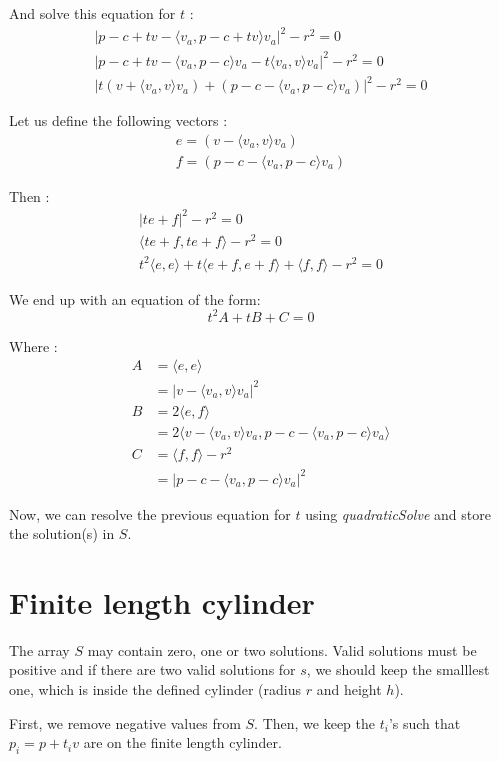 \documentclass{article}
\begin{document}
And solve this equation for $t$ :
\begin{gather*}
    |p-c+tv-\langle v_a, p-c+tv\rangle v_a|^2-r^2=0\\
    |p-c+tv - \langle v_a, p-c\rangle v_a - t\langle v_a, v\rangle v_a|^2 -r^2=0\\
    |t(v+\langle v_a, v\rangle v_a) + (p-c- \langle v_a, p-c\rangle v_a)|^2 -r^2 = 0
\end{gather*}

Let us define the following vectors :
\begin{gather*}
    e = (v-\langle v_a, v\rangle v_a)\\
    f = (p-c- \langle v_a, p-c\rangle v_a)
\end{gather*}

Then :
\begin{gather*}
    |te + f|^2 -r^2 = 0\\
    \langle te+f, te+f\rangle  -r^2 = 0\\
    t^2  \langle e,e\rangle  + t\langle e+f, e+f\rangle  + \langle f,f\rangle  -r^2 = 0
\end{gather*}

We end up with an equation of the form:
$$t^2A + tB + C = 0$$

Where :
\begin{align*}
    A &= \langle e,e\rangle  \\
    &= |v-\langle v_a, v\rangle v_a|^2\\
    B &= 2\langle e, f\rangle  \\
    &= 2\langle v-\langle v_a, v\rangle v_a, p-c- \langle v_a, p-c\rangle v_a\rangle \\
    C &= \langle f,f\rangle  -r^2 \\
    &= |p-c- \langle v_a, p-c\rangle v_a|^2
\end{align*}


Now, we can resolve the previous equation for $t$ using \textit{quadraticSolve} and store the solution(s) in $S$.

\section{Finite length cylinder}
The array $S$ may contain zero, one or two solutions. Valid solutions must be positive and if there are two valid solutions for $s$, we should keep the smalllest one, which is inside the defined cylinder (radius $r$ and height $h$).

First, we remove negative values from $S$. Then, we keep the $t_i$'s such that $p_i = p+t_iv$ are on the finite length cylinder.
\end{document}
